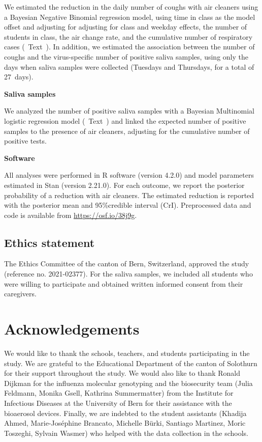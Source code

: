 \documentclass[fleqn,11pt]{wlscirep}
\begin{document}
\noindent We estimated the reduction in the daily number of coughs with air cleaners using a Bayesian Negative Binomial regression model, using time in class as the model offset and adjusting for adjusting for class and weekday effects, the number of students in class, the air change rate, and the cumulative number of respiratory cases (\supp~Text~). In addition, we estimated the association between the number of coughs and the virus-specific number of positive saliva samples, using only the days when saliva samples were collected (Tuesdays and Thursdays, for a total of 27~days).\medskip %

\noindent\textbf{Saliva samples} \smallskip

\noindent We analyzed the number of positive saliva samples with a Bayesian Multinomial logistic regression model (\supp~Text~) and linked the expected number of positive samples to the presence of air cleaners, adjusting for the cumulative number of positive tests. \medskip

\noindent\textbf{Software}\smallskip

\noindent All analyses were performed in R software (version 4.2.0) and model parameters estimated in Stan (version 2.21.0)\cite{Carpenter2017,Hoffman2014}. For each outcome, we report the posterior probability of a reduction with air cleaners. The estimated reduction is reported with the posterior mean and 95\%credible interval (CrI). Preprocessed data and code is available from \url{https://osf.io/38j9g}.


\subsection*{Ethics statement}

\noindent The Ethics Committee of the canton of Bern, Switzerland, approved the study (reference no. 2021-02377). For the saliva samples, we included all students who were willing to participate and obtained written informed consent from their caregivers.


\clearpage


\section*{Acknowledgements}
We would like to thank the schools, teachers, and students participating in the study. We are grateful to the Educational Department of the canton of Solothurn for their support throughout the study. We would also like to thank Ronald Dijkman for the influenza molecular genotyping and the biosecurity team (Julia Feldmann, Monika Gsell, Kathrina Summermatter) from the Institute for Infectious Diseases at the University of Bern for their assistance with the bioaerosol devices. Finally, we are indebted to the student assistants (Khadija Ahmed, Marie-Joséphine Brancato, Michelle Bürki, Santiago Martinez, Moric Toszeghi, Sylvain Wasmer) who helped with the data collection in the schools.
\end{document}
